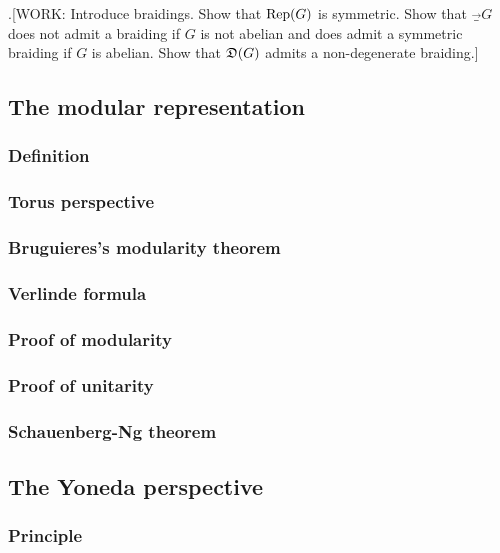 .[WORK: Introduce braidings. Show that $\operatorname{Rep}(G)$ is symmetric. Show that $\Vec_G$ does not admit a braiding if $G$ is not abelian and does admit a symmetric braiding if $G$ is abelian. Show that $\mathfrak{D}(G)$ admits a non-degenerate braiding.]


\subsection{The modular representation}

\subsubsection{Definition}

\subsubsection{Torus perspective}

\subsubsection{Bruguieres's modularity theorem}

\subsubsection{Verlinde formula}

\subsubsection{Proof of modularity}

\subsubsection{Proof of unitarity}

\subsubsection{Schauenberg-Ng theorem}



\subsection{The Yoneda perspective}

\subsubsection{Principle}

